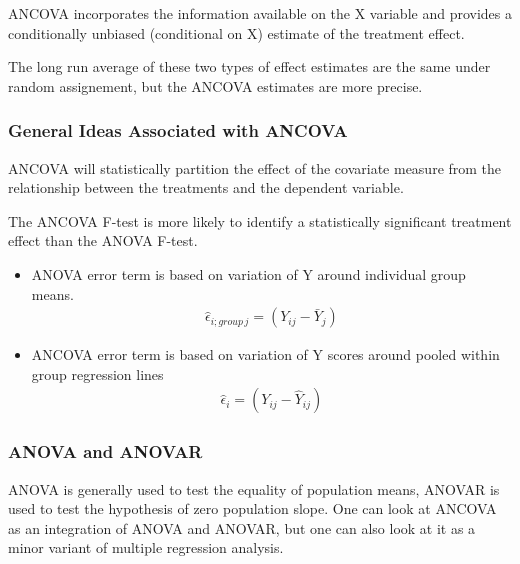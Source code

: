 \documentclass{article}
\begin{document}
ANCOVA incorporates the information available on the X variable and provides a conditionally unbiased (conditional on X) estimate of the treatment effect.


The long run average of these two types of effect estimates are the same under random assignement, but the ANCOVA estimates are more precise. 

\subsubsection*{General Ideas Associated with ANCOVA}
ANCOVA will statistically partition the effect of the covariate measure from the relationship between the treatments and the dependent variable.

The ANCOVA F-test is more likely to identify a statistically significant treatment effect than the ANOVA F-test.

\begin{itemize}
  \item ANOVA error term is based on variation of Y around individual group means.
  \begin{align}
    \hat{\epsilon}_{i;group\, j}  = (Y_{ij} - \bar{Y}_j)
  \end{align}
  \item ANCOVA error term is based on variation of Y scores around pooled within group regression lines
  \begin{align}
    \hat{\epsilon}_i  = (Y_{ij} - \hat{Y}_{ij})
  \end{align}
\end{itemize}

\subsubsection*{ANOVA and ANOVAR}
ANOVA is generally used to test the equality of population means, ANOVAR is used to test the hypothesis of zero population slope. 
One can look at ANCOVA as an integration of ANOVA and ANOVAR, but one can also look at it as a minor variant of multiple regression analysis. 
\end{document}
